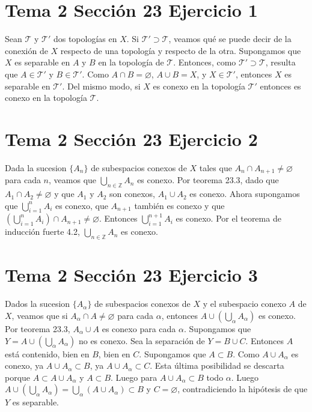 \documentclass{article}
\begin{document}
\section{Tema 2 Sección 23 Ejercicio 1}
Sean $\mathcal{T}$ y $\mathcal{T}'$ dos topologías en $X$. Si $\mathcal{T}'\supset \mathcal{T}$, veamos qué se puede decir de la conexión de $X$ respecto de una topología y respecto de la otra. Supongamos que $X$ es separable en $A$ y $B$ en la topología de $\mathcal{T}$. Entonces, como $\mathcal{T}'\supset \mathcal{T}$, resulta que $A\in \mathcal{T}'$ y $B\in \mathcal{T}'$. Como $A\cap B=\varnothing $, $A\cup B=X$, y $X\in \mathcal{T}'$, entonces $X$ es separable en $\mathcal{T}'$. Del mismo modo, si $X$ es conexo en la topología $\mathcal{T}'$ entonces es conexo en la topología $\mathcal{T}$.
\section{Tema 2 Sección 23 Ejercicio 2}
Dada la sucesion $\{A_n\}$ de subespacios conexos de $X$ tales que $A_n\cap A_{n+1}\neq \varnothing$ para cada $n$, veamos que $\bigcup_{n\in \mathbb{Z}} A_n$ es conexo. Por teorema 23.3, dado que $A_1\cap A_2\neq \varnothing$ y que $A_1$ y $A_2$ son conexos, $A_1\cup A_2$ es conexo. Ahora supongamos que $\bigcup_{i=1}^nA_i$ es conexo, que $A_{n+1}$ también es conexo y que $(\bigcup_{i=1}^nA_i)\cap A_{n+1}\neq \varnothing$. Entonces $\bigcup_{i=1}^{n+1}A_i$ es conexo. Por el teorema de inducción fuerte 4.2, $\bigcup_{n\in \mathbb{Z}}A_n$ es conexo.
\section{Tema 2 Sección 23 Ejercicio 3}
Dados la sucesion $\{A_\alpha\}$ de subespacios conexos de $X$ y el subespacio conexo $A$ de $X$, veamos que si $A_\alpha\cap A\neq \varnothing$ para cada $\alpha$, entonces $A\cup(\bigcup_\alpha A_\alpha)$ es conexo. Por teorema 23.3, $A_\alpha\cup A$ es conexo para cada $\alpha$. Supongamos que $Y=A\cup(\bigcup_\alpha A_\alpha)$ no es conexo. Sea la separación de $Y=B\cup C$. Entonces  $A$ está contenido, bien en $B$, bien en $C$. Supongamos que $A\subset B$. Como $A\cup A_\alpha$ es conexo, ya $A\cup A_\alpha\subset B$, ya $A\cup A_\alpha\subset C$. Esta última posibilidad se descarta porque $A\subset A\cup A_\alpha$ y $A\subset B$. Luego para $A\cup A_\alpha\subset B$ todo $\alpha$. Luego $A\cup (\bigcup_\alpha A_\alpha)=\bigcup_\alpha (A\cup A_\alpha)\subset B$ y $C=\varnothing$, contradiciendo la hipótesis de que $Y$ es separable.
\end{document}
